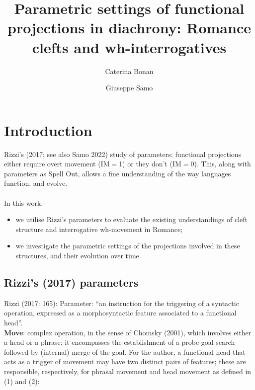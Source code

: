 \documentclass[fleqn,10pt]{wlscirep}
\title{Parametric settings of functional projections in diachrony: Romance clefts and wh-interrogatives}
\author[1,*]{Caterina Bonan}
\author[2]{Giuseppe Samo}
\affil[1]{University of Cambridge, United Kingdom.}
\affil[2]{Beijing Language and Culture University, People’s Republic of China.}
\affil[*]{Corresponding author: cb2098@cam.ac.uk}
\begin{document}
\flushbottom
\maketitle
%
%
\thispagestyle{empty}


\section*{Introduction}

Rizzi’s (2017; see also Samo 2022) study of parameters: functional projections either require overt movement (IM$=$1) or they don't (IM$=$0). 
This, along with parameters as Spell Out, allows a fine understanding of the way languages function, and evolve.\\ 
\\In this work:
\begin{itemize}
\item \vspace*{-2mm} we utilise Rizzi’s parameters to evaluate the existing understandings of cleft structure and interrogative wh-movement in Romance; 
\item \vspace*{-2mm} we investigate the parametric settings of the projections involved in these structures, and their evolution over time.
\end{itemize}

\subsection*{Rizzi's (2017) parameters}

Rizzi (2017: 165): Parameter: “an instruction for the triggering of a syntactic operation, expressed as a morphosyntactic feature associated to a functional head”.\\ 
\textbf{Move}: complex operation, in the sense of Chomsky (2001), which involves either a head or a phrase: it encompasses the establishment of a probe-goal search followed by (internal) merge of the goal. 
For the author, a functional head that acts as a trigger of movement may have two distinct pairs of features; these are responsible, respectively, for phrasal movement and head movement as defined in (1) and (2):
\end{document}
